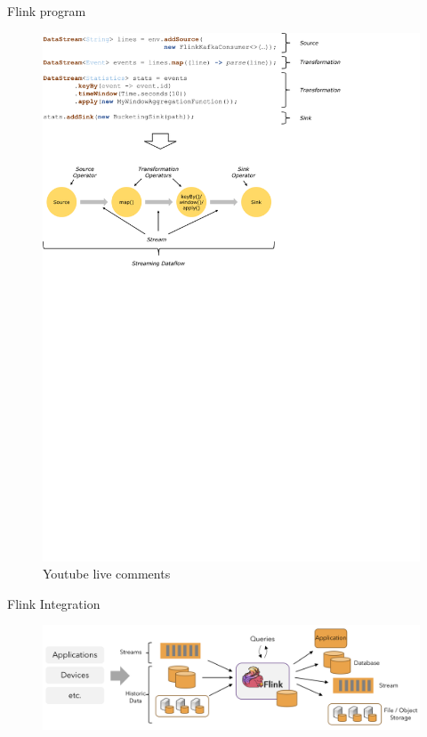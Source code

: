\documentclass[blue]{beamer}
\begin{document}
\begin{frame}{Flink program}
    \begin{figure}
        \centering
        \includegraphics[width=\textwidth]{flink_program_flow.png}
        \caption{Youtube live comments}
        \label{fig:streamexample}
    \end{figure}
\end{frame}


\begin{frame}{Flink Integration}
    \begin{figure}
        \centering
        \includegraphics[width=\textwidth]{flink-application-sources-sinks.png}
        \label{fig:streamexample}
    \end{figure}
\end{frame}
\end{document}

